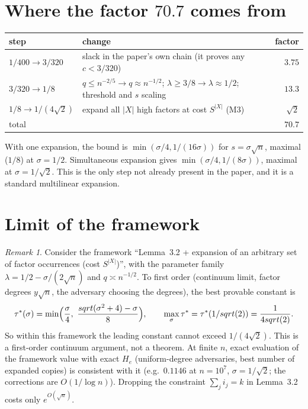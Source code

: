 \documentclass[10pt]{amsart}
\theoremstyle{remark}
\newtheorem{remark}[theorem]{Remark}
\begin{document}
\section{Where the factor $70.7$ comes from}
\begin{center}
\begin{tabular}{llr}
\toprule
step & change & factor\\
\midrule
$1/400\to3/320$ & slack in the paper's own chain (it proves any $c<3/320$) & $3.75$\\
$3/320\to1/8$ & $q\le n^{-2/5}\to q\approx n^{-1/2}$; $\lambda\ge3/8\to\lambda\approx1/2$; threshold and $s$ scaling & $13.3$\\
$1/8\to1/(4\sqrt2)$ & expand all $|X|$ high factors at cost $S^{|X|}$ (M3) & $\sqrt2$\\
\midrule
total & & $70.7$\\
\bottomrule
\end{tabular}
\end{center}
With one expansion, the bound is $\min(\sigma/4,1/(16\sigma))$ for $s=\sigma\sqrt n$, maximal
($1/8$) at $\sigma=1/2$. Simultaneous expansion gives $\min(\sigma/4,1/(8\sigma))$, maximal at
$\sigma=1/\sqrt2$. This is the only step not already present in the paper, and it is a
standard multilinear expansion.

\section{Limit of the framework}
\begin{remark}
Consider the framework ``Lemma~3.2 + expansion of an arbitrary set of factor occurrences
(cost $S^{|X|}$)'', with the parameter family $\lambda=1/2-\sigma/(2\sqrt n)$ and
$q\asymp n^{-1/2}$. To first order (continuum limit, factor degrees $y\sqrt n$, the
adversary choosing the degrees), the best provable constant is
\[
\tau^*(\sigma)=\min\Bigl(\frac\sigma4,\ \frac{\sqrt{\sigma^2+4}-\sigma}{8}\Bigr),
\qquad \max_\sigma\tau^*=\tau^*(1/\sqrt2)=\frac1{4\sqrt2}.
\]
So within this framework the leading constant cannot exceed $1/(4\sqrt2)$. This is a
first-order continuum argument, not a theorem. At finite $n$, exact evaluation of the
framework value with exact $H_e$ (uniform-degree adversaries, best number of expanded
copies) is consistent with it (e.g.\ $0.1146$ at $n=10^7$, $\sigma=1/\sqrt2$; the
corrections are $O(1/\log n)$). Dropping the constraint $\sum_ji_j=k$ in Lemma~3.2 costs only
$e^{O(\sqrt n)}$.
\end{remark}
\end{document}
